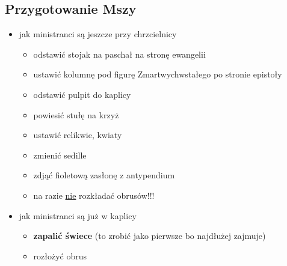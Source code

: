 \subsection{Przygotowanie Mszy}
\begin{itemize}
	\item jak ministranci są jeszcze przy chrzcielnicy
	      \begin{itemize}
		      \item odstawić stojak na paschał na stronę ewangelii
		      \item ustawić kolumnę pod figurę Zmartwychwstałego po stronie
		            epistoły
		      \item odstawić pulpit do kaplicy
		      \item powiesić stułę na krzyż
		      \item ustawić relikwie, kwiaty
		      \item zmienić sedille
		      \item zdjąć {\color{violet} fioletową} zasłonę z antypendium
		      \item na razie \underline{nie} rozkładać obrusów!!!
	      \end{itemize}
	\item jak ministranci są już w kaplicy
	      \begin{itemize}
		      \item \textbf{zapalić świece} (to zrobić jako pierwsze bo
		            najdłużej zajmuje)
		      \item rozłożyć obrus
	      \end{itemize}
\end{itemize}

